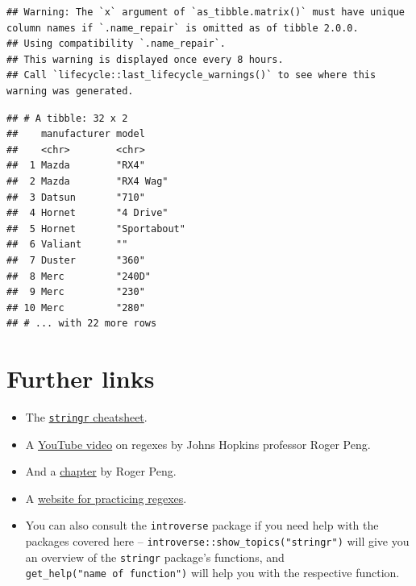 \documentclass[
]{book}
\providecommand{\tightlist}{%
  \setlength{\itemsep}{0pt}\setlength{\parskip}{0pt}}
\begin{document}
\begin{verbatim}
## Warning: The `x` argument of `as_tibble.matrix()` must have unique column names if `.name_repair` is omitted as of tibble 2.0.0.
## Using compatibility `.name_repair`.
## This warning is displayed once every 8 hours.
## Call `lifecycle::last_lifecycle_warnings()` to see where this warning was generated.
\end{verbatim}

\begin{verbatim}
## # A tibble: 32 x 2
##    manufacturer model       
##    <chr>        <chr>       
##  1 Mazda        "RX4"       
##  2 Mazda        "RX4 Wag"   
##  3 Datsun       "710"       
##  4 Hornet       "4 Drive"   
##  5 Hornet       "Sportabout"
##  6 Valiant      ""          
##  7 Duster       "360"       
##  8 Merc         "240D"      
##  9 Merc         "230"       
## 10 Merc         "280"       
## # ... with 22 more rows
\end{verbatim}

\hypertarget{further-links-1}{%
\section{Further links}\label{further-links-1}}

\begin{itemize}
\tightlist
\item
  The \href{https://github.com/rstudio/cheatsheets/blob/master/strings.pdf}{\texttt{stringr} cheatsheet}.
\item
  A \href{https://www.youtube.com/watch?v=NvHjYOilOf8}{YouTube video} on regexes by Johns Hopkins professor Roger Peng.
\item
  And a \href{https://bookdown.org/rdpeng/rprogdatascience/regular-expressions.html\#the-stringr-package}{chapter} by Roger Peng.
\item
  A \href{https://regexone.com}{website for practicing regexes}.
\item
  You can also consult the \texttt{introverse} package if you need help with the packages covered here -- \texttt{introverse::show\_topics("stringr")} will give you an overview of the \texttt{stringr} package's functions, and \texttt{get\_help("name\ of\ function")} will help you with the respective function.
\end{itemize}

  
\end{document}
